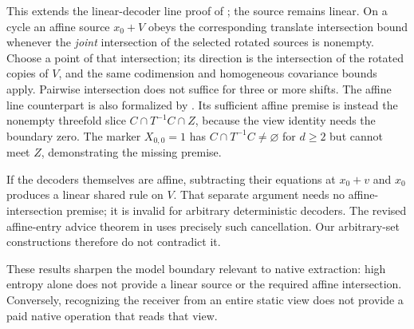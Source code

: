 This extends the linear-decoder line proof of
\cite[theorem ``The line form of Theorem TP'']{SeventeenthPaper2026}; the source remains linear.
On a cycle an affine source $x_0+V$ obeys the corresponding translate
intersection bound whenever the \emph{joint} intersection of the selected
rotated sources is nonempty. Choose a point of that intersection; its
direction is the intersection of the rotated copies of $V$, and the
same codimension and homogeneous covariance bounds apply. Pairwise
intersection does not suffice for three or more shifts. The affine line counterpart is also formalized by
. Its
sufficient affine premise is instead the nonempty threefold slice
$C\cap T^{-1}C\cap Z$, because the view identity needs the boundary zero.
The marker $X_{0,0}=1$ has $C\cap T^{-1}C\ne\varnothing$ for $d\ge2$
but cannot meet $Z$, demonstrating the missing premise.

If the decoders themselves are affine, subtracting their equations at
$x_0+v$ and $x_0$ produces a linear shared rule on $V$. That separate
argument needs no affine-intersection premise; it is invalid for arbitrary
deterministic decoders. The revised affine-entry advice theorem in
\cite[Corollary~6.16]{SeventeenthPaper2026} uses precisely such cancellation.
Our arbitrary-set constructions therefore do not contradict it.

These results sharpen the model boundary relevant to native extraction:
high entropy alone does not provide a linear source or the required affine
intersection. Conversely, recognizing the receiver from an entire static
view does not provide a paid native operation that reads that view.
